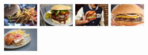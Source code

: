 \documentclass[10pt]{article}
\begin{document}
			\begin{figure}[H]
				\centering
				\begin{subfigure}[b]{1.025\textwidth}
					\includegraphics[width=0.19\textwidth]{images/data/burger2/1.jpg}
					\includegraphics[width=0.19\textwidth]{images/data/burger2/2.jpg}
					\includegraphics[width=0.19\textwidth]{images/data/burger2/3.jpg}
					\includegraphics[width=0.19\textwidth]{images/data/burger2/4.jpg}
					\includegraphics[width=0.19\textwidth]{images/data/burger2/5.jpg}
				\end{subfigure}


\end{figure}
\end{document}
